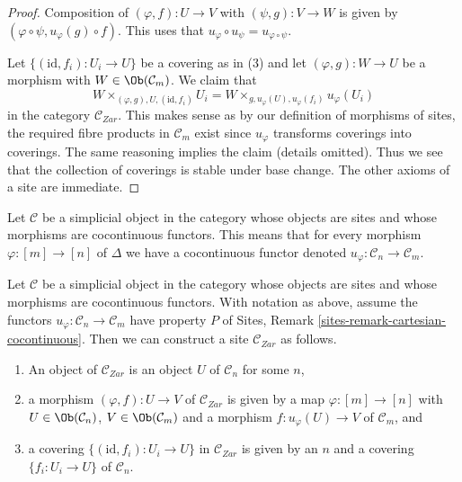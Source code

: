 \begin{proof}
Composition of $(\varphi, f) : U \to V$ with $(\psi, g) : V \to W$
is given by $(\varphi \circ \psi, u_\varphi(g) \circ f)$.
This uses that $u_\varphi \circ u_\psi = u_{\varphi \circ \psi}$.

\medskip\noindent
Let $\{(\text{id}, f_i) :  U_i \to U\}$ be a covering as in (3)
and let $(\varphi, g) : W \to U$ be a morphism with
$W \in \Ob(\mathcal{C}_m)$. We claim that
$$
W \times_{(\varphi, g), U, (\text{id}, f_i)} U_i =
W \times_{g, u_\varphi(U), u_\varphi(f_i)} u_\varphi(U_i)
$$
in the category $\mathcal{C}_{Zar}$. This makes sense as by our
definition of morphisms of sites, the required fibre products
in $\mathcal{C}_m$ exist since $u_\varphi$ transforms coverings into
coverings. The same reasoning implies the claim (details omitted).
Thus we see that the collection of coverings is stable under base
change. The other axioms of a site are immediate.
\end{proof}

\noindent
Let $\mathcal{C}$ be a simplicial object in the category whose objects are
sites and whose morphisms are cocontinuous functors. This means that for
every morphism $\varphi : [m] \to [n]$ of $\Delta$ we have a cocontinuous
functor denoted $u_\varphi : \mathcal{C}_n \to \mathcal{C}_m$.

\begin{lemma}
\label{lemma-simplicial-cocontinuous-site}
Let $\mathcal{C}$ be a simplicial object in the category whose objects are
sites and whose morphisms are cocontinuous functors. With notation as above,
assume the functors $u_\varphi : \mathcal{C}_n \to \mathcal{C}_m$
have property $P$ of Sites, Remark \ref{sites-remark-cartesian-cocontinuous}.
Then we can construct a site $\mathcal{C}_{Zar}$ as follows.
\begin{enumerate}
\item An object of $\mathcal{C}_{Zar}$ is an object $U$ of
$\mathcal{C}_n$ for some $n$,
\item a morphism $(\varphi, f) : U \to V$ of $\mathcal{C}_{Zar}$
is given by a map $\varphi : [m] \to [n]$ with
$U \in \Ob(\mathcal{C}_n)$, $V \in \Ob(\mathcal{C}_m)$
and a morphism $f : u_\varphi(U) \to V$ of $\mathcal{C}_m$, and
\item a covering $\{(\text{id}, f_i) :  U_i \to U\}$ in $\mathcal{C}_{Zar}$
is given by an $n$ and a covering $\{f_i : U_i \to U\}$
of $\mathcal{C}_n$.
\end{enumerate}
\end{lemma}

